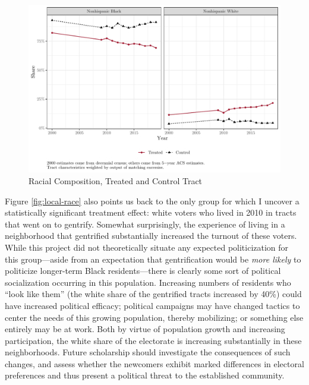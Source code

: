 \documentclass[
  12pt,
]{article}
\begin{document}
\begin{figure}[H]

{\centering \includegraphics{gentrification_files/figure-latex/race-time-1} 

}

\caption{\label{fig:local-race}Racial Composition, Treated and Control Tract}\label{fig:race-time}
\end{figure}

Figure \ref{fig:local-race} also points us back to the only group for which I uncover a statistically significant treatment effect: white voters who lived in 2010 in tracts that went on to gentrify. Somewhat surprisingly, the experience of living in a neighborhood that gentrified substantially increased the turnout of these voters. While this project did not theoretically situate any expected politicization for this group---aside from an expectation that gentrification would be \emph{more likely} to politicize longer-term Black residents---there is clearly some sort of political socialization occurring in this population. Increasing numbers of residents who ``look like them'' (the white share of the gentrified tracts increased by 40\%) could have increased political efficacy; political campaigns may have changed tactics to center the needs of this growing population, thereby mobilizing; or something else entirely may be at work. Both by virtue of population growth and increasing participation, the white share of the electorate is increasing substantially in these neighborhoods. Future scholarship should investigate the consequences of such changes, and assess whether the newcomers exhibit marked differences in electoral preferences and thus present a political threat to the established community.
\end{document}
